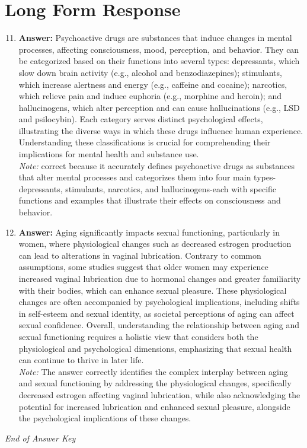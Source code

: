 \documentclass[12pt]{article}
\begin{document}
\section*{Long Form Response}
\begin{enumerate}[label=\arabic*.]
\setcounter{enumi}{10}
\item \textbf{Answer:} Psychoactive drugs are substances that induce changes in mental processes, affecting consciousness, mood, perception, and behavior. They can be categorized based on their functions into several types: depressants, which slow down brain activity (e.g., alcohol and benzodiazepines); stimulants, which increase alertness and energy (e.g., caffeine and cocaine); narcotics, which relieve pain and induce euphoria (e.g., morphine and heroin); and hallucinogens, which alter perception and can cause hallucinations (e.g., LSD and psilocybin). Each category serves distinct psychological effects, illustrating the diverse ways in which these drugs influence human experience. Understanding these classifications is crucial for comprehending their implications for mental health and substance use.
\\ \textit{Note:} correct because it accurately defines psychoactive drugs as substances that alter mental processes and categorizes them into four main types-depressants, stimulants, narcotics, and hallucinogens-each with specific functions and examples that illustrate their effects on consciousness and behavior.
\item \textbf{Answer:} Aging significantly impacts sexual functioning, particularly in women, where physiological changes such as decreased estrogen production can lead to alterations in vaginal lubrication. Contrary to common assumptions, some studies suggest that older women may experience increased vaginal lubrication due to hormonal changes and greater familiarity with their bodies, which can enhance sexual pleasure. These physiological changes are often accompanied by psychological implications, including shifts in self-esteem and sexual identity, as societal perceptions of aging can affect sexual confidence. Overall, understanding the relationship between aging and sexual functioning requires a holistic view that considers both the physiological and psychological dimensions, emphasizing that sexual health can continue to thrive in later life.
\\ \textit{Note:} The answer correctly identifies the complex interplay between aging and sexual functioning by addressing the physiological changes, specifically decreased estrogen affecting vaginal lubrication, while also acknowledging the potential for increased lubrication and enhanced sexual pleasure, alongside the psychological implications of these changes.
\end{enumerate}

\vfill
\noindent\textit{End of Answer Key}
\end{document}
